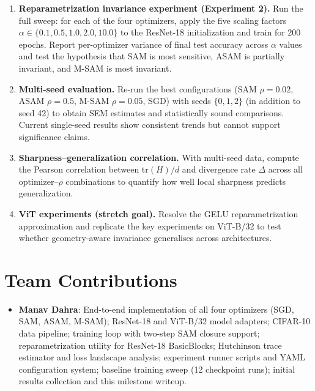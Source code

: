 \documentclass{article}
\begin{document}
\begin{enumerate}[noitemsep,topsep=2pt]
  \item \textbf{Reparametrization invariance experiment (Experiment 2).}  Run the full sweep: for each of the four optimizers, apply the five scaling factors $\alpha \in \{0.1, 0.5, 1.0, 2.0, 10.0\}$ to the ResNet-18 initialization and train for 200 epochs.  Report per-optimizer variance of final test accuracy across $\alpha$ values and test the hypothesis that SAM is most sensitive, ASAM is partially invariant, and M-SAM is most invariant.

  \item \textbf{Multi-seed evaluation.}  Re-run the best configurations (SAM $\rho{=}0.02$, ASAM $\rho{=}0.5$, M-SAM $\rho{=}0.05$, SGD) with seeds $\{0, 1, 2\}$ (in addition to seed 42) to obtain SEM estimates and statistically sound comparisons.  Current single-seed results show consistent trends but cannot support significance claims.

  \item \textbf{Sharpness--generalization correlation.}  With multi-seed data, compute the Pearson correlation between $\mathrm{tr}(H)/d$ and divergence rate $\Delta$ across all optimizer--$\rho$ combinations to quantify how well local sharpness predicts generalization.

  \item \textbf{ViT experiments (stretch goal).}  Resolve the GELU reparametrization approximation and replicate the key experiments on ViT-B/32 to test whether geometry-aware invariance generalises across architectures.
\end{enumerate}


\section{Team Contributions}
\begin{itemize}
    \item \textbf{Manav Dahra}: End-to-end implementation of all four optimizers (SGD, SAM, ASAM, M-SAM); ResNet-18 and ViT-B/32 model adapters; CIFAR-10 data pipeline; training loop with two-step SAM closure support; reparametrization utility for ResNet-18 BasicBlocks; Hutchinson trace estimator and loss landscape analysis; experiment runner scripts and YAML configuration system; baseline training sweep (12 checkpoint runs); initial results collection and this milestone writeup.
\end{itemize}
\end{document}
